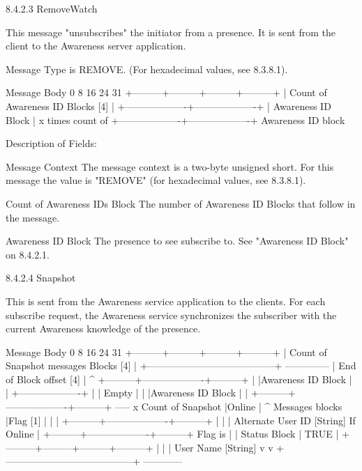 \documentclass[titlepage,oneside]{book}
\begin{document}
8.4.2.3 RemoveWatch

This message "unsubscribes" the initiator from a presence. It is sent 
from the client to the Awareness server application.

Message Type is REMOVE.
  (For hexadecimal values, see 8.3.8.1).

Message Body
0         8         16        24      31
+---------+---------+---------+---------+
| Count of Awareness ID Blocks [4]      |
+-------------------+-------------------+
| Awareness ID Block                    | x times count of
+-------------------+-------------------+   Awareness ID block

Description of Fields:

Message Context
  The message context is a two-byte unsigned short. For this message 
  the value is "REMOVE" (for hexadecimal values, see 
  8.3.8.1).

Count of Awareness IDs Block
  The number of Awareness ID Blocks that follow in the message.

Awareness ID Block
  The presence to see subscribe to. See "Awareness ID Block" on
  8.4.2.1.


8.4.2.4 Snapshot

This is sent from the Awareness service application to the clients.
For each subscribe request, the Awareness service synchronizes the
subscriber with the current Awareness knowledge of the presence.

Message Body
0         8         16        24      31
+---------+---------+---------+---------+
| Count of Snapshot messages Blocks [4] |
+---------------------------------------+ --------------
|      End of Block offset [4]          |            ^
+---------+-------------------+---------+            |
          |Awareness ID Block |                      |
          +-------------------+                      |
          |       Empty       |                      |
          |Awareness ID Block |                      |
+---------+-------------------+---------+ -----  x Count of Snapshot
|Online   |                                  ^      Messages blocks
|Flag [1] |                                  |       |
+---------+-------------------+---------+    |       |
| Alternate User ID [String]               If Online |
+---------+-------------------+---------+  Flag is   |
          |   Status Block    |              TRUE    |
+---------+---------+---------+---------+    |       |
| User Name [String]                         v       v
+---------------------------------------+ ------------
\end{document}
